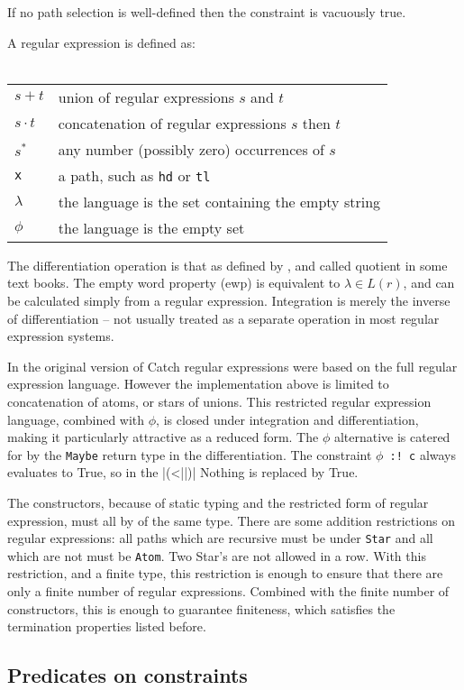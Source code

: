 \documentclass[preprint]{sigplanconf}
\newcommand{\T}[1]{\texttt{#1}}
\newcommand{\K}{\ensuremath{^\ast}} %
\newcommand{\D}{\ensuremath{\cdot}} %
\begin{document}
If no path selection is well-defined then the constraint is vacuously true.

A regular expression is defined as:\\ \\
\begin{tabular}{ll}
$s+t$ & union of regular expressions $s$ and $t$ \\
$s\D t$ & concatenation of regular expressions $s$ then $t$ \\
$s\K$  & any number (possibly zero) occurrences of $s$ \\
\T{x} & a path, such as \T{hd} or \T{tl} \\
$\lambda$ & the language is the set containing the empty string \\
$\phi$ & the language is the empty set
\end{tabular}

The differentiation operation is that as defined by \citet{conway}, and called quotient in some text books. The empty word property (ewp) is equivalent to $\lambda \in L(r)$, and can be calculated simply from a regular expression. Integration is merely the inverse of differentiation -- not usually treated as a separate operation in most regular expression systems.

In the original version of Catch regular expressions were based on the full regular expression language. However the implementation above is limited to concatenation of atoms, or stars of unions. This restricted regular expression language, combined with $\phi$, is closed under integration and differentiation, making it particularly attractive as a reduced form. The $\phi$ alternative is catered for by the \T{Maybe} return type in the differentiation. The constraint \T{$\phi$ :! c} always evaluates to True, so in the |(<||)| Nothing is replaced by True.

The constructors, because of static typing and the restricted form of regular expression, must all by of the same type. There are some addition restrictions on regular expressions: all paths which are recursive must be under \T{Star} and all which are not must be \T{Atom}. Two Star's are not allowed in a row. With this restriction, and a finite type, this restriction is enough to ensure that there are only a finite number of regular expressions. Combined with the finite number of constructors, this is enough to guarantee finiteness, which satisfies the termination properties listed before.

\subsection{Predicates on constraints}
\end{document}
